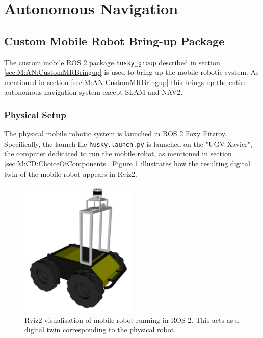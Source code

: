 \FloatBarrier
\section{Autonomous Navigation} \label{sec:R:AutonomousNavigaion}

\FloatBarrier
\subsection{Custom Mobile Robot Bring-up Package}
 The custom mobile ROS 2 package \lstinline{husky_group} described in section \ref{sec:M:AN:CustomMRBringup} is used to bring up the mobile robotic system. As mentioned in section \ref{sec:M:AN:CustomMRBringup} this brings up the entire autonomous navigation system except SLAM and NAV2.
 
 \FloatBarrier
 \subsubsection{Physical Setup}
 The physical mobile robotic system is launched in ROS 2 Foxy Fitzroy. Specifically, the launch file \lstinline{husky.launch.py} is launched on the "UGV Xavier", the computer dedicated to run the mobile robot, as mentioned in section \ref{sec:M:CD:ChoiceOfComponents}. Figure \ref{fig:M:AN:MC:digitalTwin} illustrates how the resulting digital twin of the mobile robot appears in Rviz2.

\begin{figure}[htp!]
  \centering
  \includegraphics[width = 0.5\textwidth]{Figures/figHuskyRviz.pdf}
  \caption{Rviz2 visualisation of mobile robot running in ROS 2. This acts as a digital twin corresponding to the physical robot.}
  \label{fig:M:AN:MC:digitalTwin}
\end{figure}

